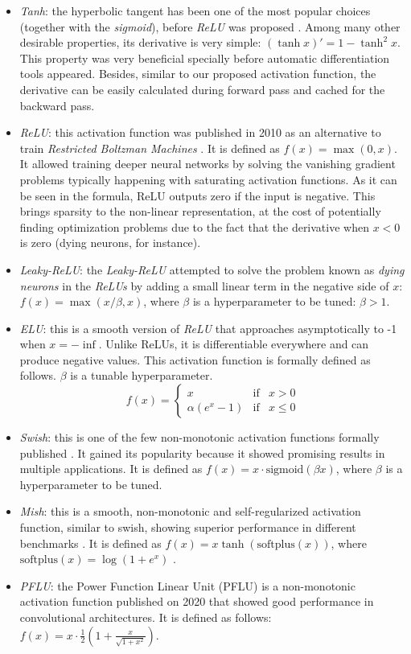 \documentclass[authoryear]{elsarticle}
\begin{document}
\begin{itemize}
	\item \textit{Tanh}: the hyperbolic tangent has been one of the most popular choices (together with the \textit{sigmoid}), before \textit{ReLU} was proposed \citep{lecun2012}. Among many other desirable properties, its derivative is very simple: $(\tanh x)'=1-\tanh^2 x$. This property was very beneficial specially before automatic differentiation tools appeared. Besides, similar to our proposed activation function, the derivative can be easily calculated during forward pass and cached for the backward pass. 
	\item \textit{ReLU}: this activation function was published in 2010 as an alternative to train \textit{Restricted Boltzman Machines} \citep{nair2010}. It is defined as $f(x) = \max(0,x)$. It allowed training deeper neural networks by solving the vanishing gradient problems typically happening with saturating activation functions. As it can be seen in the formula, ReLU outputs zero if the input is negative. This brings sparsity to the non-linear representation, at the cost of potentially finding optimization problems due to the fact that the derivative when $x<0$ is zero (dying neurons, for instance).
	\item \textit{Leaky-ReLU}: the \textit{Leaky-ReLU} \citep{xu2015} attempted to solve the problem known as \textit{dying neurons} in the \textit{ReLUs} by adding a small linear term in the negative side of $x$: $f(x) = \max(x/\beta, x)$, where $\beta$ is a hyperparameter to be tuned: $\beta>1$.
	\item \textit{ELU}: this is a smooth version of \textit{ReLU} \citep{djork2016} that approaches asymptotically to -1 when $x=-\inf$. Unlike ReLUs, it is differentiable everywhere and can produce negative values. This activation function is formally defined as follows. $\beta$ is a tunable hyperparameter.
	$$
	f(x)= \left\{ \begin{array}{lcc}
		x &   \text{if}  & x > 0 \\
 \alpha(e^x - 1) &  \text{if} & x \leq 0 
	\end{array}
	\right.
	$$
	
	\item \textit{Swish}: this is one of the few non-monotonic activation functions formally published \citep{ramachandran2018}. It gained its popularity because it showed promising results in multiple applications. It is defined as $f(x) = x \cdot \text{sigmoid}(\beta x)$, where $\beta$ is a hyperparameter to be tuned.
	\item \textit{Mish}: this is a smooth, non-monotonic and self-regularized activation function, similar to swish, showing superior performance in different benchmarks \citep{misra2019mish}. It is defined as $f(x) = x \tanh (\text{softplus} (x))$, where $\text{softplus} (x) = \log(1+e^x)$ \citep{dugas2001}.
	\item \textit{PFLU}: the Power Function Linear Unit (PFLU) is a non-monotonic activation function published on 2020 that showed good performance in convolutional architectures. It is defined as follows: $f(x) = x \cdot \frac{1}{2} \left( 1 + \frac{x}{\sqrt{1+x^2}} \right)$.
	
\end{itemize}
\end{document}
